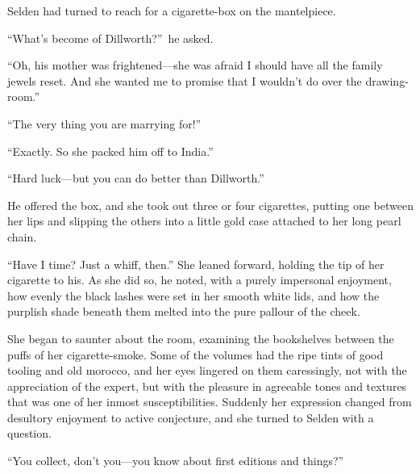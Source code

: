 \documentclass[12pt,a4paper]{book}
\begin{document}
Selden had turned to reach for a cigarette-box on the
mantelpiece.





``What's become of Dillworth?''\ he asked.





``Oh, his mother was frightened---she was afraid I should have all
the family jewels reset. And she wanted me to promise that I
wouldn't do over the drawing-room.''





``The very thing you are marrying for!''





``Exactly. So she packed him off to India.''





``Hard luck---but you can do better than Dillworth.''





He offered the box, and she took out three or four cigarettes,
putting one between her lips and slipping the others into a
little gold case attached to her long pearl chain.





``Have I time? Just a whiff, then.'' She leaned forward, holding
the tip of her cigarette to his. As she did so, he noted, with a
purely impersonal enjoyment, how evenly the black lashes were set
in her smooth white lids, and how the purplish shade beneath them
melted into the pure pallour of the cheek.





She began to saunter about the room, examining the bookshelves
between the puffs of her cigarette-smoke. Some of the volumes had
the ripe tints of good tooling and old morocco, and her eyes
lingered on them caressingly, not with the appreciation of the
expert, but with the pleasure in agreeable tones and textures
that was one of her inmost susceptibilities. Suddenly her
expression changed from desultory enjoyment to active conjecture,
and she turned to Selden with a question.





``You collect, don't you---you know about first editions and
things?''
\end{document}
